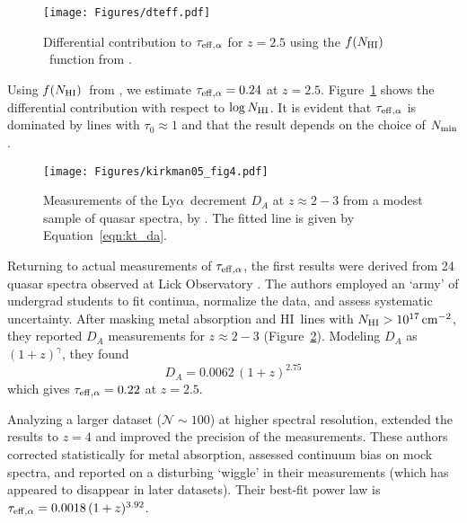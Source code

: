 \documentclass[graybox]{svmult}
\newcommand{\HI}{H{\sc I}}
\def\lya{Ly$\alpha$}
\newcommand{\mnhi}{N_{\rm HI}}
\def\cm#1{\, {\rm cm^{#1}}}
\def\mfnhi{f(\mnhi)}
\def\fnhi{$\mfnhi$}
\begin{document}
%
\begin{figure}[b]
\sidecaption
\texttt{[image: Figures/dteff.pdf]}
%
%
\caption{Differential contribution to 
$\tau_{\rm eff, \alpha}$ for $z=2.5$ using the
\fnhi\ function from \cite{pro+14}.
}
\label{fig:dteff}       %
\end{figure}

Using \fnhi\ from \cite{pro+14}, %
we estimate $\tau_{\rm eff, \alpha} = 0.24$ at $z=2.5$.
Figure~\ref{fig:dteff} shows the
differential contribution with respect to $\log \mnhi$.
It is evident that $\tau_{\rm eff,\alpha}$
is dominated by lines with $\tau_0 \approx 1$ and
that the result
depends on the choice of $N_{\rm min}$. 

%
\begin{figure}[b]
\sidecaption
\texttt{[image: Figures/kirkman05\_fig4.pdf]}
%
%
\caption{Measurements of the \lya\ decrement
$D_A$ at $z \approx 2-3$ from a modest sample of
quasar spectra, by \cite{kts+05}.
The fitted line is given by Equation~\ref{eqn:kt_da}.
}
\label{fig:DA}       %
\end{figure}

Returning to actual measurements of $\tau_{\rm eff,\alpha}$,
the first results were derived from
24 quasar spectra observed at Lick Observatory
\cite{kts+05}.  The authors employed an
`army' of undergrad students to fit continua,
normalize the data, and assess
systematic uncertainty.
After masking metal absorption and \HI\
lines with $\mnhi > 10^{17} \cm{-2}$, they
reported $D_A$ measurements for $z \approx 2-3$
(Figure~\ref{fig:DA}).
Modeling $D_A$ as $(1+z)^\gamma$, they found
\begin{equation}
D_A = 0.0062 \, (1+z)^{2.75}
\label{eqn:kt_da}
\end{equation}
which gives $\tau_{\rm eff, \alpha} = 0.22$ 
at $z=2.5$.

Analyzing a larger dataset ($\mathcal{N} \sim 100$)
at higher spectral
resolution, \cite{fpl+08} extended the results
to $z=4$ and improved the precision of the
measurements.  These authors
corrected statistically for metal absorption,
assessed continuum bias on mock spectra, and
reported on a disturbing `wiggle' in their measurements
(which has appeared to disappear in later datasets).
Their best-fit power law
is $\tau_{\rm eff, \alpha} = 0.0018 \, (1+z)^{3.92}$.
\end{document}
